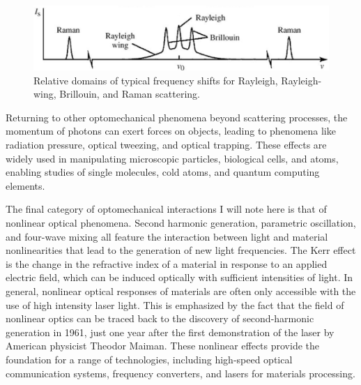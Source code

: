 
\begin{figure}[t] %
\centering
\includegraphics[width=0.75\linewidth]{figs/1-Intro/Boyd scattering frequency shift domains.png}
\caption{Relative domains of typical frequency shifts for Rayleigh, Rayleigh-wing, Brillouin, and Raman scattering.}
\label{fig:Introduction:scattering-domains}
\end{figure}

Returning to other optomechanical phenomena beyond scattering processes, the momentum of photons can exert forces on objects, leading to phenomena like radiation pressure, optical tweezing, and optical trapping. These effects are widely used in manipulating microscopic particles\cite{}, biological cells\cite{}, and atoms\cite{}, enabling studies of single molecules\cite{}, cold atoms\cite{}, and quantum computing elements\cite{}.

The final category of optomechanical interactions I will note here is that of nonlinear optical phenomena. Second harmonic generation, parametric oscillation, and four-wave mixing all feature the interaction between light and material nonlinearities that lead to the generation of new light frequencies.\cite{boyd2020nonlinear} The Kerr effect is the change in the refractive index of a material in response to an applied electric field, which can be induced optically with sufficient intensities of light. In general, nonlinear optical responses of materials are often only accessible with the use of high intensity laser light. This is emphasized by the fact that the field of nonlinear optics can be traced back to the discovery of second-harmonic generation in 1961\cite{franken1961generation}, just one year after the first demonstration of the laser by American physicist Theodor Maiman.\cite{maiman1960stimulated} These nonlinear effects provide the foundation for a range of technologies, including high-speed optical communication systems\cite{}, frequency converters\cite{}, and lasers for materials processing\cite{}.

